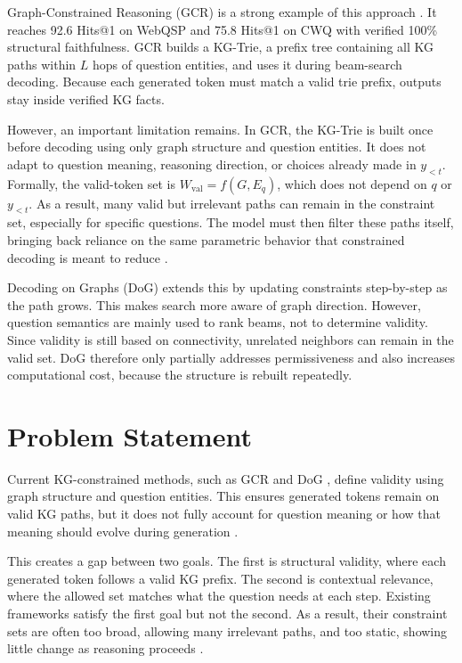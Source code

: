 Graph-Constrained Reasoning (GCR) is a strong example of this approach \citep{luo2025-graph-constrained-reasoning}. It reaches 92.6 Hits@1 on WebQSP and 75.8 Hits@1 on CWQ with verified 100\% structural faithfulness. GCR builds a KG-Trie, a prefix tree \citep{fredkin1960trie} containing all KG paths within $L$ hops of question entities, and uses it during beam-search decoding. Because each generated token must match a valid trie prefix, outputs stay inside verified KG facts.

However, an important limitation remains. In GCR, the KG-Trie is built once before decoding using only graph structure and question entities. It does not adapt to question meaning, reasoning direction, or choices already made in $y_{<t}$. Formally, the valid-token set is $W_{\mathrm{val}} = f(G, E_q)$, which does not depend on $q$ or $y_{<t}$. As a result, many valid but irrelevant paths can remain in the constraint set, especially for specific questions. The model must then filter these paths itself, bringing back reliance on the same parametric behavior that constrained decoding is meant to reduce \citep{li2024-decoding-on-graphs,luo2025-graph-constrained-reasoning}.

Decoding on Graphs (DoG) \citep{li2024-decoding-on-graphs} extends this by updating constraints step-by-step as the path grows. This makes search more aware of graph direction. However, question semantics are mainly used to rank beams, not to determine validity. Since validity is still based on connectivity, unrelated neighbors can remain in the valid set. DoG therefore only partially addresses permissiveness and also increases computational cost, because the structure is rebuilt repeatedly.

\section{Problem Statement}

Current KG-constrained methods, such as GCR \citep{luo2025-graph-constrained-reasoning} and DoG \citep{li2024-decoding-on-graphs}, define validity using graph structure and question entities. This ensures generated tokens remain on valid KG paths, but it does not fully account for question meaning or how that meaning should evolve during generation \citep{geng2023grammarconstrained,willard2023outlines}.

This creates a gap between two goals. The first is structural validity, where each generated token follows a valid KG prefix. The second is contextual relevance, where the allowed set matches what the question needs at each step. Existing frameworks satisfy the first goal but not the second. As a result, their constraint sets are often too broad, allowing many irrelevant paths, and too static, showing little change as reasoning proceeds \citep{li2024-decoding-on-graphs,luo2025-graph-constrained-reasoning}.

